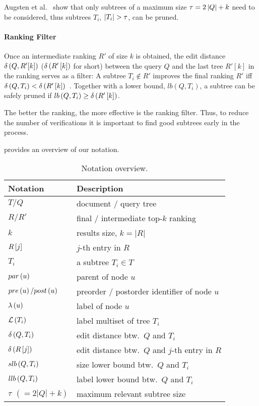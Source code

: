 Augsten et al.~\cite{augsten-icde-2010} show that only subtrees of a maximum size $\tau = 2\left| Q \right| + k$ need to be considered, thus subtrees $T_i$, $\left| T_i \right| > \tau$, can be pruned.

\paragraph{Ranking Filter}

Once an intermediate ranking $R'$ of size $k$ is obtained, the edit distance $\delta \left( Q, R'[k] \right)$ ($\delta \left( R'\left[ k \right] \right)$ for short) between the query $Q$ and the last tree $R'[k]$ in the ranking serves as a filter:  A subtree $T_i\notin R'$ improves the final ranking $R'$ iff $\delta \left( Q, T_i \right) < \delta \left( R'\left[ k \right] \right)$~\cite{augsten-icde-2010}.
%
Together with a lower bound, $lb \left( Q, T_i \right)$, a subtree can be safely pruned if $lb \left( Q, T_i \right) \geq \delta \left( R'\left[ k \right] \right)$.

The better the ranking, the more effective is the ranking filter. Thus, to reduce the number of verifications it is important to find good subtrees early in the process.

 provides an overview of our notation.
\parskip0pt\begin{table}[ht!]
  \centering
  \caption{Notation overview.}
  \label{tbl:notation-overview}
  {\small
  \begin{tabular}{l|l}
    Notation & Description \tabularnewline
    \hline\hline
    $T / Q$ & document / query tree \tabularnewline
    $R/R'$ & final / intermediate top-$k$ ranking \tabularnewline
    $k$ &  results size, $k=|R|$ \tabularnewline
    $R\left[ j \right]$ & $j$-th entry in $R$ \tabularnewline
    $T_i$ & a subtree $T_i \in T$ \tabularnewline
    $par \left( u \right)$ & parent of node $u$ \tabularnewline
    $pre \left( u \right)/post \left( u \right)$ & preorder / postorder identifier of node $u$ \tabularnewline
    $\lambda \left( u \right)$ & label of node $u$ \tabularnewline
    $\mathcal{L} \left( T_i \right)$ & label multiset of tree $T_i$ \tabularnewline
    $\delta \left( Q, T_i \right)$ & edit distance btw.\  $Q$ and $T_i$ \tabularnewline
    $\delta \left( R\left[ j \right] \right)$ & edit distance btw.\ $Q$ and $j$-th entry in $R$ \tabularnewline
    $slb \left( Q, T_i \right)$ & size lower bound btw.\  $Q$ and $T_i$ \tabularnewline
    $llb \left( Q, T_i \right)$ & label lower bound btw.\  $Q$ and $T_i$ \tabularnewline
    $\tau\ \,(=2|Q|+k)$ & maximum relevant subtree size~\cite{augsten-icde-2010}
  \end{tabular}}
\end{table}
